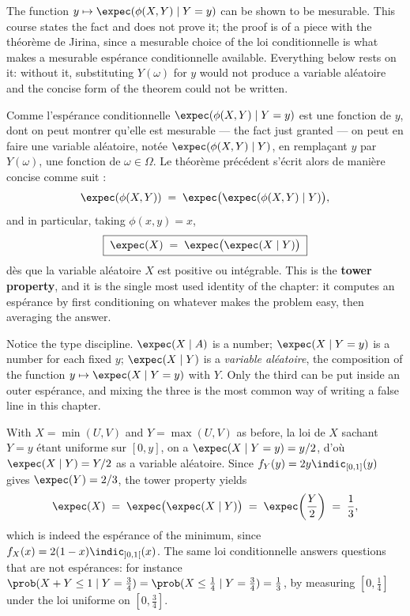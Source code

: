 \begin{remark}
  The function $y \mapsto \expec(\phi(X,Y) \mid Y = y)$ can be shown to be
  mesurable. This course states the fact and does not prove it; the proof is of a
  piece with the théorème de Jirina, since a mesurable choice of the loi
  conditionnelle is what makes a mesurable espérance conditionnelle available.
  Everything below rests on it: without it, substituting $Y(\omega)$ for $y$ would
  not produce a variable aléatoire and the concise form of the theorem could not be
  written.
\end{remark}

Comme l'espérance conditionnelle $\expec(\phi(X,Y) \mid Y = y)$ est une fonction de
$y$, dont on peut montrer qu'elle est mesurable --- the fact just granted --- on peut
en faire une variable aléatoire, notée $\expec(\phi(X,Y) \mid Y)$, en remplaçant
$y$ par $Y(\omega)$, une fonction de $\omega \in \Omega$. Le théorème précédent
s'écrit alors de manière concise comme suit :
\[
  \expec(\phi(X,Y)) \;=\; \expec\big( \expec(\phi(X,Y) \mid Y) \big) ,
\]
and in particular, taking $\phi(x,y) = x$,
\begin{equation*}
  \boxed{\;\expec(X) \;=\; \expec\big( \expec(X \mid Y) \big)\;}
\end{equation*}
dès que la variable aléatoire $X$ est positive ou intégrable. This is the
\textbf{tower property}, and it is the single most used identity of the chapter:
it computes an espérance by first
conditioning on whatever makes the problem easy, then averaging the answer.

\begin{remark}
  Notice the type discipline. $\expec(X \mid A)$ is a number;
  $\expec(X \mid Y = y)$ is a number for each fixed $y$;
  $\expec(X \mid Y)$ is a \emph{variable aléatoire}, the composition of the function
  $y \mapsto \expec(X \mid Y = y)$ with $Y$. Only the third can be put inside an
  outer espérance, and mixing the three is the most common way of writing a
  false line in this chapter.
\end{remark}

\begin{example}
  With $X = \min(U,V)$ and $Y = \max(U,V)$ as before, la loi de $X$ sachant $Y = y$
  étant uniforme sur $[0,y]$, on a $\expec(X \mid Y = y) = y/2$, d'où
  $\expec(X \mid Y) = Y/2$ as a variable aléatoire. Since
  $f_{Y}(y) = 2y \indic_{[0,1]}(y)$ gives $\expec(Y) = 2/3$, the tower property
  yields
  \[
    \expec(X) \;=\; \expec\big( \expec(X \mid Y) \big) \;=\; \expec\!\left( \frac{Y}{2} \right) \;=\; \frac{1}{3} ,
  \]
  which is indeed the espérance of the minimum, since
  $f_{X}(x) = 2(1-x)\indic_{]0,1[}(x)$. The same loi conditionnelle answers questions
  that are not espérances: for instance
  $\prob(X + Y \leq 1 \mid Y = \tfrac{3}{4}) = \prob(X \leq \tfrac{1}{4} \mid Y = \tfrac{3}{4}) = \tfrac{1}{3}$,
  by measuring $[0,\tfrac{1}{4}]$ under the loi uniforme on $[0,\tfrac{3}{4}]$.
\end{example}

